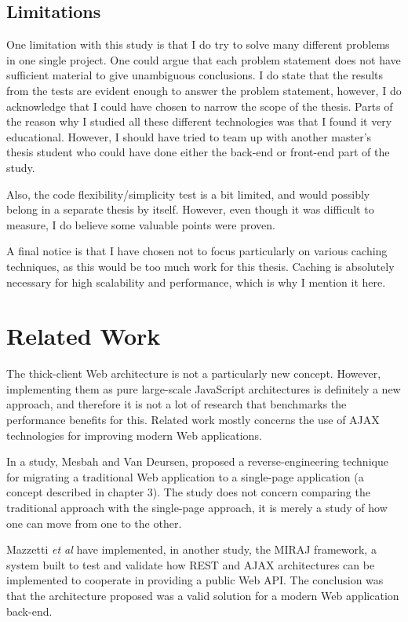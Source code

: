 \subsection{Limitations}
One limitation with this study is that I do try to solve many different problems in one single project. One could argue that each problem statement does not have sufficient material to give unambiguous conclusions. I do state that the results from the tests are evident enough to answer the problem statement, however, I do acknowledge that I could have chosen to narrow the scope of the thesis. Parts of the reason why I studied all these different technologies was that I found it very educational. However, I should have tried to team up with another master's thesis student who could have done either the back-end or front-end part of the study. 

Also, the code flexibility/simplicity test is a bit limited, and would possibly belong in a separate thesis by itself. However, even though it was difficult to measure, I do believe some valuable points were proven. 

A final notice is that I have chosen not to focus particularly on various caching techniques, as this would be  too much work for this thesis. Caching is absolutely necessary for high scalability and performance, which is why I mention it here.  

\section{Related Work}
The thick-client Web architecture is not a particularly new concept. However, implementing them as pure large-scale JavaScript architectures is definitely a new approach, and therefore it is not a lot of research that benchmarks the performance benefits for this. Related work mostly concerns the use of AJAX technologies for improving modern Web applications.

In a study, Mesbah and Van Deursen\cite{mesbah2007migrating}, proposed a reverse-engineering technique for migrating a traditional Web application to a single-page application (a concept described in chapter 3). The study does not concern comparing the traditional approach with the single-page approach, it is merely a study of how one can move from one to the other.

Mazzetti \textit{et al}\cite{4530218} have implemented, in another study, the MIRAJ framework, a system built to test and validate how REST and AJAX architectures can be implemented to cooperate in providing a public Web API. The conclusion was that the architecture proposed was a valid solution for a modern Web application back-end.

